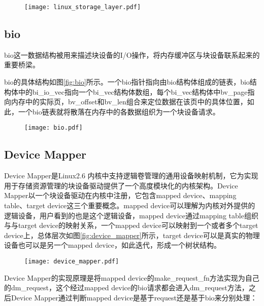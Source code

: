 \begin{figure}[!htbp]
    \centering
    \texttt{[image: linux\_storage\_layer.pdf]}
\end{figure}

\subsection{bio}
\label{sec:bio}

bio这一数据结构被用来描述块设备的I/O操作，将内存缓冲区与块设备联系起来的重要桥梁\cite{corbet2005linux}。

bio的具体结构如图\ref{fig:bio}所示。一个bio指针指向由bio结构体组成的链表，bio结构体中的bi\_io\_vec指向一个bi\_vec结构体数组，每个bi\_vec结构体中bv\_page指向内存中的实际页，bv\_offset和bv\_len组合来定位数据在该页中的具体位置，如此，一个bio链表就将散落在内存中的各数据组织为一个块设备请求。

\begin{figure}[!htbp]
    \centering
    \texttt{[image: bio.pdf]}
\end{figure}

\subsection{Device Mapper}

Device Mapper是Linux2.6 内核中支持逻辑卷管理的通用设备映射机制，它为实现用于存储资源管理的块设备驱动提供了一个高度模块化的内核架构\cite{bovet2005understanding}。Device Mapper以一个块设备驱动在内核中注册，它包含mapped device、mapping table、target device这三个重要概念。mapped device可以理解为内核对外提供的逻辑设备，用户看到的也是这个逻辑设备，mapped device通过mapping table组织与与target device的映射关系，一个mapped device可以映射到一个或者多个target device上，总体层次如图\ref{fig:device_mapper}所示，target device可以是真实的物理设备也可以是另一个mapped device，如此迭代，形成一个树状结构。

\begin{figure}[!htbp]
    \centering
    \texttt{[image: device\_mapper.pdf]}
\end{figure}

Device Mapper的实现原理是将mapped device的make\_request\_fn方法实现为自己的dm\_request，这个经过mapped device的bio请求都会进入dm\_request方法，之后Device Mapper通过判断mapped device是基于request还是基于bio来分别处理：

